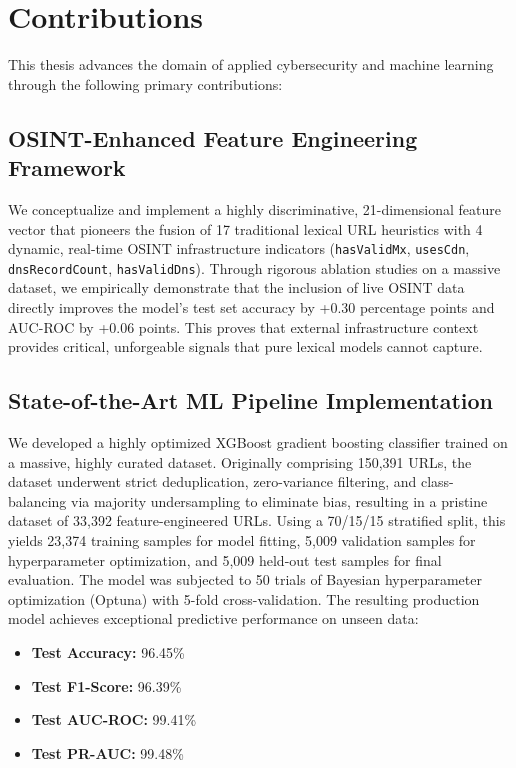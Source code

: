 \section{Contributions}\label{contributions}

This thesis advances the domain of applied cybersecurity and machine
learning through the following primary contributions:

\subsection{OSINT-Enhanced Feature Engineering
Framework}\label{osint-enhanced-feature-engineering-framework}

We conceptualize and implement a highly discriminative, 21-dimensional
feature vector that pioneers the fusion of 17 traditional lexical URL
heuristics with 4 dynamic, real-time OSINT infrastructure indicators
(\texttt{hasValidMx}, \texttt{usesCdn}, \texttt{dnsRecordCount},
\texttt{hasValidDns}). Through rigorous ablation studies on a massive
dataset, we empirically demonstrate that the inclusion of live OSINT
data directly improves the model's test set accuracy by +0.30 percentage
points and AUC-ROC by +0.06 points. This proves that external
infrastructure context provides critical, unforgeable signals that pure
lexical models cannot capture.

\subsection{State-of-the-Art ML Pipeline
Implementation}\label{state-of-the-art-ml-pipeline-implementation}

We developed a highly optimized XGBoost gradient boosting classifier
trained on a massive, highly curated dataset. Originally comprising
150,391 URLs, the dataset underwent strict deduplication, zero-variance
filtering, and class-balancing via majority undersampling to eliminate
bias, resulting in a pristine dataset of 33,392 feature-engineered URLs.
Using a 70/15/15 stratified split, this yields 23,374 training samples for model fitting, 5,009 validation samples for hyperparameter optimization, and 5,009 held-out test samples for final evaluation. The model was subjected to 50 trials
of Bayesian hyperparameter optimization (Optuna) with 5-fold
cross-validation. The resulting production model achieves exceptional
predictive performance on unseen data:

\begin{itemize}
\item
  \textbf{Test Accuracy:} 96.45\%
\item
  \textbf{Test F1-Score:} 96.39\%
\item
  \textbf{Test AUC-ROC:} 99.41\%
\item
  \textbf{Test PR-AUC:} 99.48\%
\end{itemize}

